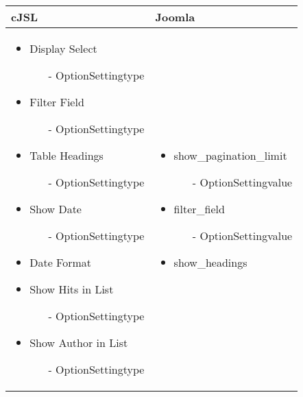 \begin{minipage}{0.6\textwidth}
\begin{tabular}{|p{} | p{}|}
\hline
\textbf{cJSL} & \textbf{Joomla} \\ 
\hline
\begin{itemize}
	\item Display Select
		\begin{enumerate}
			\item[-] OptionSettingtype
		\end{enumerate}
	\item Filter Field
		\begin{enumerate}
			\item[-] OptionSettingtype
		\end{enumerate} 
	\item Table Headings
		\begin{enumerate}
			\item[-] OptionSettingtype
		\end{enumerate}
	\item Show Date 
		\begin{enumerate}
			\item[-] OptionSettingtype
		\end{enumerate} 
	\item Date Format 
	\item Show Hits in List
		\begin{enumerate}
			\item[-] OptionSettingtype
		\end{enumerate} 
	\item Show Author in List
		\begin{enumerate}
			\item[-] OptionSettingtype
		\end{enumerate} 
\end{itemize}
 & 
\begin{itemize}
	\item show\_pagination\_limit
		\begin{enumerate}
			\item[-] OptionSettingvalue
		\end{enumerate}
	\item filter\_field
		\begin{enumerate}
			\item[-] OptionSettingvalue
		\end{enumerate} 
	\item show\_headings
		\begin{enumerate}

\end{enumerate}
\end{itemize}
\end{tabular}
\end{minipage}
